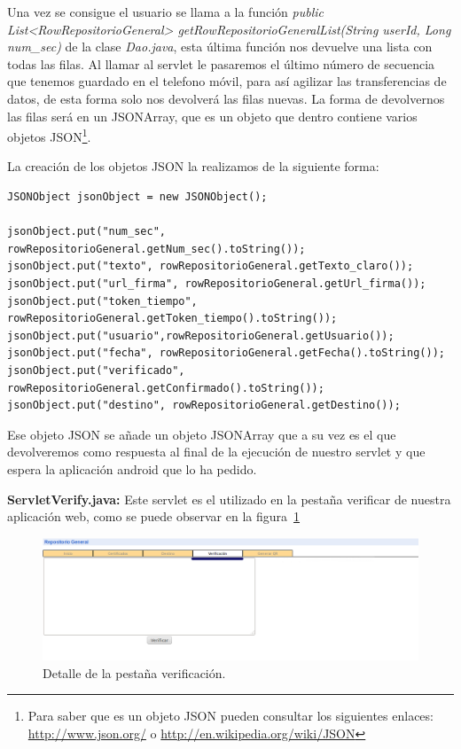\begin{description}
Una vez se consigue el usuario se llama a la función \textit{public List<RowRepositorioGeneral> getRowRepositorioGeneralList(String userId, Long num\_sec)} de la clase \textit{Dao.java}, esta última función nos devuelve una lista con todas las filas. Al llamar al servlet le pasaremos el último número de secuencia que tenemos guardado en el telefono móvil, para así agilizar las transferencias de datos, de esta forma solo nos devolverá las filas nuevas. La forma de devolvernos las filas será en un JSONArray, que es un objeto que dentro contiene varios objetos JSON\footnote{Para saber que es un objeto JSON pueden consultar los siguientes enlaces: \url{http://www.json.org/} o \url{http://en.wikipedia.org/wiki/JSON}}.

La creación de los objetos JSON la realizamos de la siguiente forma:
\begin{lstlisting}[style=Java]
JSONObject jsonObject = new JSONObject();

jsonObject.put("num_sec", rowRepositorioGeneral.getNum_sec().toString());
jsonObject.put("texto", rowRepositorioGeneral.getTexto_claro());
jsonObject.put("url_firma", rowRepositorioGeneral.getUrl_firma());
jsonObject.put("token_tiempo", rowRepositorioGeneral.getToken_tiempo().toString());
jsonObject.put("usuario",rowRepositorioGeneral.getUsuario());
jsonObject.put("fecha", rowRepositorioGeneral.getFecha().toString());
jsonObject.put("verificado", rowRepositorioGeneral.getConfirmado().toString());
jsonObject.put("destino", rowRepositorioGeneral.getDestino());
\end{lstlisting}

Ese objeto JSON se añade un objeto JSONArray que a su vez es el que devolveremos como respuesta al final de la ejecución de nuestro servlet y que espera la aplicación android que lo ha pedido.

\item \textbf{ServletVerify.java:} Este servlet es el utilizado en la pestaña verificar de nuestra aplicación web, como se puede observar en la figura~\ref{fig:pestañaVerificar}

\begin{figure}
  \centering
    \includegraphics[scale=0.5]{./GoogleAppEngine/imagenes/pestanhaVerificar.png}
  \caption{Detalle de la pestaña verificación.}
  \label{fig:pestañaVerificar}
\end{figure}


\end{description}
